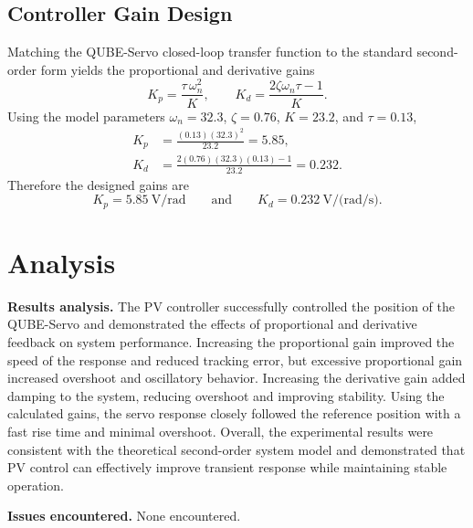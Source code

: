 \documentclass[11pt]{article}
\begin{document}
\subsection{Controller Gain Design}
Matching the QUBE-Servo closed-loop transfer function to the standard second-order form
yields the proportional and derivative gains
\begin{equation}
    K_p = \frac{\tau\,\omega_n^{2}}{K},
    \qquad
    K_d = \frac{2\zeta\omega_n\tau - 1}{K}.
    \label{eq:gains}
\end{equation}
Using the model parameters $\omega_n = 32.3$, $\zeta = 0.76$, $K = 23.2$, and
$\tau = 0.13$,
\begin{align}
    K_p &= \frac{(0.13)(32.3)^{2}}{23.2} = 5.85, \\[4pt]
    K_d &= \frac{2(0.76)(32.3)(0.13) - 1}{23.2} = 0.232 .
\end{align}
Therefore the designed gains are
\begin{equation}
    K_p = \SI{5.85}{\volt\per\radian}
    \qquad\text{and}\qquad
    K_d = \SI{0.232}{\volt\per(\radian\per\second)} .
\end{equation}

\section{Analysis}
\textbf{Results analysis.} The PV controller successfully controlled the position of the
QUBE-Servo and demonstrated the effects of proportional and derivative feedback on system
performance. Increasing the proportional gain improved the speed of the response and reduced
tracking error, but excessive proportional gain increased overshoot and oscillatory
behavior. Increasing the derivative gain added damping to the system, reducing overshoot and
improving stability. Using the calculated gains, the servo response closely followed the
reference position with a fast rise time and minimal overshoot. Overall, the experimental
results were consistent with the theoretical second-order system model and demonstrated that
PV control can effectively improve transient response while maintaining stable operation.

\textbf{Issues encountered.} None encountered.

\end{document}
